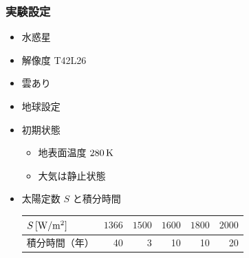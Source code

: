 \documentclass[aspectratio=149,9pt,fleqn]{beamer}
\begin{document}
\begin{frame}
	\frametitle{実験設定}
	\begin{itemize}
		\item 水惑星
		\item 解像度 T42L26
		\item 雲あり
		\item 地球設定
		\item 初期状態
			\begin{itemize}
				\item 地表面温度 \(280\hmu{K}\)
				\item 大気は静止状態
			\end{itemize}
		\item 太陽定数 \(S\) と積分時間
			\begin{table}
				\begin{tabular}{lrrrrr}
					\hline
					\(S\hmu{[W/m^2]}\)&\(1366\)&\(1500\)&\(1600\)&\(1800\)&\(2000\)\\
					\hline
					積分時間（年）&40&3&10&10&20\\
					\hline
				\end{tabular}
			\end{table}
	\end{itemize}
\end{frame}
\end{document}
